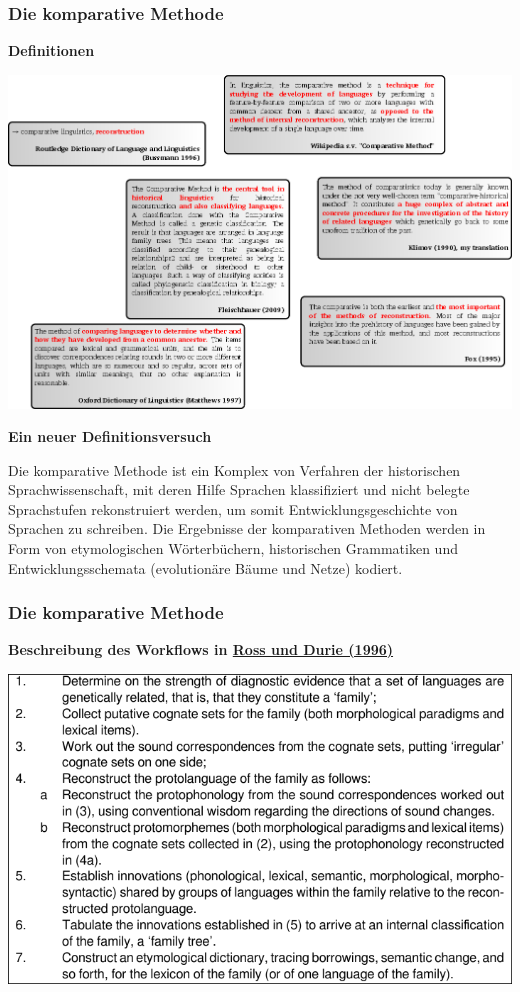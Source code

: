 \subsubsection{\texorpdfstring{{Die komparative
Methode}}{Die komparative Methode}}

\par\noindent\textbf{Definitionen}

\includegraphics[width=\textwidth]{img/cm-wirr.png}



\par\noindent\textbf{Ein neuer Definitionsversuch}

Die komparative Methode ist ein Komplex von Verfahren der historischen
Sprachwissenschaft, mit deren Hilfe Sprachen klassifiziert und nicht
belegte Sprachstufen rekonstruiert werden, um somit
Entwicklungsgeschichte von Sprachen zu schreiben. Die Ergebnisse der
komparativen Methoden werden in Form von etymologischen Wörterbüchern,
historischen Grammatiken und Entwicklungsschemata (evolutionäre Bäume
und Netze) kodiert.


\subsubsection{\texorpdfstring{{Die komparative
Methode}}{Die komparative Methode}}

\par\noindent\textbf{Beschreibung des Workflows in
\href{http://bibliography.lingpy.org?key=Ross1996}{Ross und Durie
(1996)}}

\includegraphics[width=\textwidth]{img/rodu.pdf}



